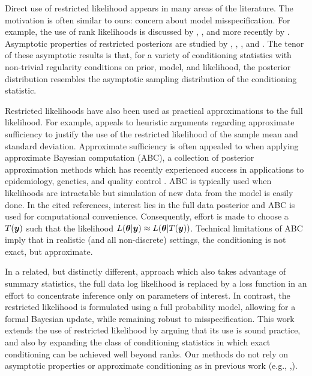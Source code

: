 \documentclass[12pt]{article}
\def\bth{\mbox{\boldmath $\theta$}}
\newcommand{\by}{\mbox{\boldmath $y$}}
\begin{document}
Direct use of restricted likelihood appears in many areas of the literature.  The motivation is often similar to ours:   
concern about model misspecification.  For example, the use of rank likelihoods is discussed by \cite{savage1969}, \cite{pettitt1983, pettitt1982}, and more recently by \cite{hoff2013}. Asymptotic properties of restricted posteriors are studied by \cite{doksum1990}, \cite{clarke1995}, \cite{yuan2004},  and \cite{hwang2005}. The tenor of these asymptotic 
results is that, for a variety of conditioning statistics with non-trivial regularity conditions on prior, model, and likelihood, the
posterior distribution resembles the asymptotic sampling distribution of the conditioning statistic.  

Restricted likelihoods have also been used as practical approximations to the full likelihood. For example, \cite{pratt1965} appeals to heuristic arguments regarding approximate sufficiency to justify the use of the restricted likelihood of the sample mean and standard deviation. Approximate sufficiency is  often appealed to when applying approximate Bayesian computation (ABC), a collection of posterior approximation methods which has recently experienced success in applications to epidemiology, genetics, and quality control \citep[see, for example,][]{tavare1997, pritchard1999,  marjoram2003, fearnhead2012}. ABC is typically used when likelihoods are intractable but simulation of new data from the model is easily done. In the cited references, interest lies in the full data posterior and ABC is used for computational 
convenience.  Consequently, effort is made to choose a $T(\by)$ such that the likelihood 
$L(\bth|\by) \approx L(\bth|T(\by))$.  Technical limitations of ABC imply that in realistic (and all non-discrete) settings,
the conditioning is not exact, but approximate.  

In a related, but distinctly different, approach which also takes advantage of summary statistics, the full data log likelihood is replaced by a loss function \citep[e.g.][]{bissiri2013} in an effort to concentrate inference only on parameters of interest. In contrast, the restricted likelihood is formulated using a full probability model, allowing for a formal Bayesian update, while remaining robust to misspecification. This work extends the use of restricted likelihood by arguing that its use is sound practice, and also by expanding the class of conditioning statistics in which exact conditioning can be achieved well beyond ranks.  Our methods do not rely on asymptotic properties or approximate conditioning as in previous work (e.g., \cite{albert1988},\cite{hoffwakefield2013}).  
\end{document}
